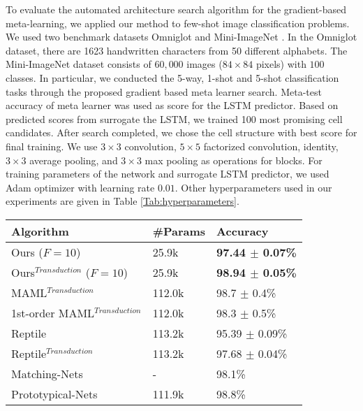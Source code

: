 \documentclass{article}
\begin{document}
To evaluate the automated architecture search algorithm for the gradient-based meta-learning, we applied our method to few-shot image classification problems. We used two benchmark datasets Omniglot \cite{Lake1332} and Mini-ImageNet \cite{Vinyals:nips2016:DBLP:conf/nips/VinyalsBLKW16}\cite{ravi:opt_fewshot:DBLP:conf/iclr/RaviL17}. In the Omniglot dataset, there are 1623 handwritten characters from 50 different alphabets. The Mini-ImageNet dataset consists of $60,000$ images ($84\times 84$  pixels) with $100$ classes.
In particular, we conducted the 5-way, 1-shot and 5-shot classification tasks through the proposed gradient based meta learner search.
Meta-test accuracy of meta learner was used as score for the LSTM predictor. Based on predicted scores from surrogate the LSTM, we trained 100 most promising cell candidates.
After search completed, we chose the cell structure with best score for final training. We use $3\times3$ convolution, $5\times5$ factorized convolution, identity, $3\times3$ average pooling, and $3\times3$ max pooling as operations for blocks. For training parameters of the network and surrogate LSTM predictor, we used Adam optimizer with learning rate $0.01$. Other hyperparameters used in our experiments are given in Table \ref{Tab:hyperparameters}.
 \centering
 \begin{tabular}{l|l|l}
 \hline
  Algorithm& \#Params &Accuracy\\
  \hline
  Ours ($F=10$) & 25.9k & \bf{97.44} $\pm$ \bf{0.07}\%\\
  Ours$^{Transduction}$ ($F=10$) & 25.9k & \bf{98.94} $\pm$ \bf{0.05}\%\\
  MAML$^{Transduction}$ \cite{finn:maml:DBLP:conf/icml/FinnAL17}& 112.0k & 98.7 $\pm$ 0.4\%\\
  1st-order MAML$^{Transduction}$ \cite{nichol:reptile:DBLP:journals/corr/abs-1803-02999}& 112.0k &98.3 $\pm$ 0.5\%\\
  Reptile \cite{nichol:reptile:DBLP:journals/corr/abs-1803-02999}& 113.2k & 95.39 $\pm$ 0.09\%\\
  Reptile$^{Transduction}$ \cite{nichol:reptile:DBLP:journals/corr/abs-1803-02999}& 113.2k & 97.68 $\pm$ 0.04\%\\
  \hline
  Matching-Nets \cite{Vinyals:nips2016:DBLP:conf/nips/VinyalsBLKW16}&-& 98.1\%\\
 Prototypical-Nets \cite{Snell:nips2017:DBLP:conf/nips/SnellSZ17}&111.9k&  98.8\%\\
 \hline
 \end{tabular}
 \\ \smallskip
\end{document}
